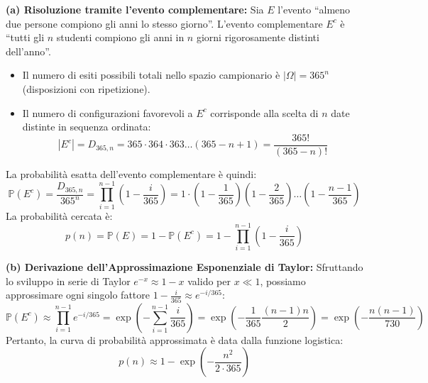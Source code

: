 \begin{dimostrazione}
\textbf{(a) Risoluzione tramite l'evento complementare:}
Sia $E$ l'evento ``almeno due persone compiono gli anni lo stesso giorno''. L'evento complementare $E^c$ è ``tutti gli $n$ studenti compiono gli anni in $n$ giorni rigorosamente distinti dell'anno''.
\begin{itemize}
    \item Il numero di esiti possibili totali nello spazio campionario è $|\Omega| = 365^n$ (disposizioni con ripetizione).
    \item Il numero di configurazioni favorevoli a $E^c$ corrisponde alla scelta di $n$ date distinte in sequenza ordinata:
    \begin{equation}
        |E^c| = D_{365, n} = 365 \cdot 364 \cdot 363 \dots (365 - n + 1) = \frac{365!}{(365-n)!}
    \end{equation}
\end{itemize}
La probabilità esatta dell'evento complementare è quindi:
\begin{equation}
    \mathbb{P}(E^c) = \frac{D_{365, n}}{365^n} = \prod_{i=1}^{n-1} \left(1 - \frac{i}{365}\right) = 1 \cdot \left(1 - \frac{1}{365}\right)\left(1 - \frac{2}{365}\right)\dots \left(1 - \frac{n-1}{365}\right)
\end{equation}
La probabilità cercata è:
\begin{equation}
    p(n) = \mathbb{P}(E) = 1 - \mathbb{P}(E^c) = 1 - \prod_{i=1}^{n-1} \left(1 - \frac{i}{365}\right)
\end{equation}

\textbf{(b) Derivazione dell'Approssimazione Esponenziale di Taylor:}
Sfruttando lo sviluppo in serie di Taylor $e^{-x} \approx 1 - x$ valido per $x \ll 1$, possiamo approssimare ogni singolo fattore $1 - \frac{i}{365} \approx e^{-i/365}$:
\begin{equation}
    \mathbb{P}(E^c) \approx \prod_{i=1}^{n-1} e^{-i/365} = \exp\left(-\sum_{i=1}^{n-1} \frac{i}{365}\right) = \exp\left(-\frac{1}{365} \frac{(n-1)n}{2}\right) = \exp\left(-\frac{n(n-1)}{730}\right)
\end{equation}
Pertanto, la curva di probabilità approssimata è data dalla funzione logistica:
\begin{equation}
    p(n) \approx 1 - \exp\left(-\frac{n^2}{2 \cdot 365}\right)
\end{equation}


\end{dimostrazione}
